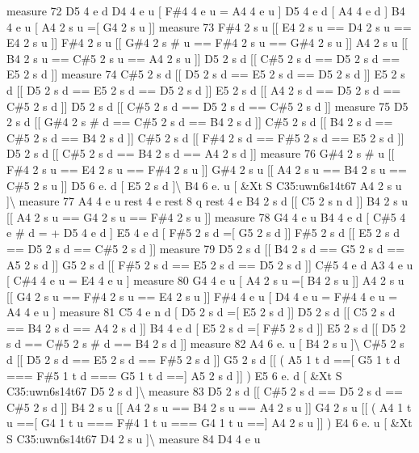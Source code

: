 measure 72 D5 4 e d D4 4 e u \mbox{[} F\#4 4 e u = A4 4 e u \mbox{]} D5 4 e d \mbox{[} A4 4 e d \mbox{]} B4 4 e u \mbox{[} A4 2 s u =\mbox{[} G4 2 s u \mbox{]}\mbox{]} measure 73 F\#4 2 s u \mbox{[}\mbox{[} E4 2 s u == D4 2 s u == E4 2 s u \mbox{]}\mbox{]} F\#4 2 s u \mbox{[}\mbox{[} G\#4 2 s \# u == F\#4 2 s u == G\#4 2 s u \mbox{]}\mbox{]} A4 2 s u \mbox{[}\mbox{[} B4 2 s u == C\#5 2 s u == A4 2 s u \mbox{]}\mbox{]} D5 2 s d \mbox{[}\mbox{[} C\#5 2 s d == D5 2 s d == E5 2 s d \mbox{]}\mbox{]} measure 74 C\#5 2 s d \mbox{[}\mbox{[} D5 2 s d == E5 2 s d == D5 2 s d \mbox{]}\mbox{]} E5 2 s d \mbox{[}\mbox{[} D5 2 s d == E5 2 s d == D5 2 s d \mbox{]}\mbox{]} E5 2 s d \mbox{[}\mbox{[} A4 2 s d == D5 2 s d == C\#5 2 s d \mbox{]}\mbox{]} D5 2 s d \mbox{[}\mbox{[} C\#5 2 s d == D5 2 s d == C\#5 2 s d \mbox{]}\mbox{]} measure 75 D5 2 s d \mbox{[}\mbox{[} G\#4 2 s \# d == C\#5 2 s d == B4 2 s d \mbox{]}\mbox{]} C\#5 2 s d \mbox{[}\mbox{[} B4 2 s d == C\#5 2 s d == B4 2 s d \mbox{]}\mbox{]} C\#5 2 s d \mbox{[}\mbox{[} F\#4 2 s d == F\#5 2 s d == E5 2 s d \mbox{]}\mbox{]} D5 2 s d \mbox{[}\mbox{[} C\#5 2 s d == B4 2 s d == A4 2 s d \mbox{]}\mbox{]} measure 76 G\#4 2 s \# u \mbox{[}\mbox{[} F\#4 2 s u == E4 2 s u == F\#4 2 s u \mbox{]}\mbox{]} G\#4 2 s u \mbox{[}\mbox{[} A4 2 s u == B4 2 s u == C\#5 2 s u \mbox{]}\mbox{]} D5 6 e. d \mbox{[} E5 2 s d \mbox{]}\textbackslash{} B4 6 e. u \mbox{[} \&Xt S C35\+:uwn6s14t67 A4 2 s u \mbox{]}\textbackslash{} measure 77 A4 4 e u rest 4 e rest 8 q rest 4 e B4 2 s d \mbox{[}\mbox{[} C5 2 s n d \mbox{]}\mbox{]} B4 2 s u \mbox{[}\mbox{[} A4 2 s u == G4 2 s u == F\#4 2 s u \mbox{]}\mbox{]} measure 78 G4 4 e u B4 4 e d \mbox{[} C\#5 4 e \# d = + D5 4 e d \mbox{]} E5 4 e d \mbox{[} F\#5 2 s d =\mbox{[} G5 2 s d \mbox{]}\mbox{]} F\#5 2 s d \mbox{[}\mbox{[} E5 2 s d == D5 2 s d == C\#5 2 s d \mbox{]}\mbox{]} measure 79 D5 2 s d \mbox{[}\mbox{[} B4 2 s d == G5 2 s d == A5 2 s d \mbox{]}\mbox{]} G5 2 s d \mbox{[}\mbox{[} F\#5 2 s d == E5 2 s d == D5 2 s d \mbox{]}\mbox{]} C\#5 4 e d A3 4 e u \mbox{[} C\#4 4 e u = E4 4 e u \mbox{]} measure 80 G4 4 e u \mbox{[} A4 2 s u =\mbox{[} B4 2 s u \mbox{]}\mbox{]} A4 2 s u \mbox{[}\mbox{[} G4 2 s u == F\#4 2 s u == E4 2 s u \mbox{]}\mbox{]} F\#4 4 e u \mbox{[} D4 4 e u = F\#4 4 e u = A4 4 e u \mbox{]} measure 81 C5 4 e n d \mbox{[} D5 2 s d =\mbox{[} E5 2 s d \mbox{]}\mbox{]} D5 2 s d \mbox{[}\mbox{[} C5 2 s d == B4 2 s d == A4 2 s d \mbox{]}\mbox{]} B4 4 e d \mbox{[} E5 2 s d =\mbox{[} F\#5 2 s d \mbox{]}\mbox{]} E5 2 s d \mbox{[}\mbox{[} D5 2 s d == C\#5 2 s \# d == B4 2 s d \mbox{]}\mbox{]} measure 82 A4 6 e. u \mbox{[} B4 2 s u \mbox{]}\textbackslash{} C\#5 2 s d \mbox{[}\mbox{[} D5 2 s d == E5 2 s d == F\#5 2 s d \mbox{]}\mbox{]} G5 2 s d \mbox{[}\mbox{[} ( A5 1 t d ==\mbox{[} G5 1 t d === F\#5 1 t d === G5 1 t d ==\mbox{]} A5 2 s d \mbox{]}\mbox{]} ) E5 6 e. d \mbox{[} \&Xt S C35\+:uwn6s14t67 D5 2 s d \mbox{]}\textbackslash{} measure 83 D5 2 s d \mbox{[}\mbox{[} C\#5 2 s d == D5 2 s d == C\#5 2 s d \mbox{]}\mbox{]} B4 2 s u \mbox{[}\mbox{[} A4 2 s u == B4 2 s u == A4 2 s u \mbox{]}\mbox{]} G4 2 s u \mbox{[}\mbox{[} ( A4 1 t u ==\mbox{[} G4 1 t u === F\#4 1 t u === G4 1 t u ==\mbox{]} A4 2 s u \mbox{]}\mbox{]} ) E4 6 e. u \mbox{[} \&Xt S C35\+:uwn6s14t67 D4 2 s u \mbox{]}\textbackslash{} measure 84 D4 4 e u 